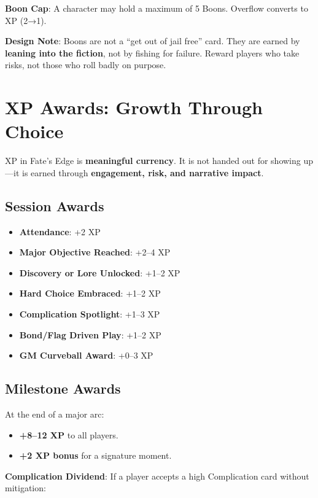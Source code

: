 \textbf{Boon Cap}: A character may hold a maximum of 5 Boons. Overflow converts to XP (2→1).

\textbf{Design Note}: Boons are not a “get out of jail free” card. They are earned by \textbf{leaning into the fiction}, not by fishing for failure. Reward players who take risks, not those who roll badly on purpose.

\section*{XP Awards: Growth Through Choice}

XP in Fate’s Edge is \textbf{meaningful currency}. It is not handed out for showing up—it is earned through \textbf{engagement, risk, and narrative impact}.

\subsection*{Session Awards}

\begin{itemize}
    \item \textbf{Attendance}: +2 XP
    \item \textbf{Major Objective Reached}: +2–4 XP
    \item \textbf{Discovery or Lore Unlocked}: +1–2 XP
    \item \textbf{Hard Choice Embraced}: +1–2 XP
    \item \textbf{Complication Spotlight}: +1–3 XP
    \item \textbf{Bond/Flag Driven Play}: +1–2 XP
    \item \textbf{GM Curveball Award}: +0–3 XP
\end{itemize}

\subsection*{Milestone Awards}

At the end of a major arc:

\begin{itemize}
    \item \textbf{+8–12 XP} to all players.
    \item \textbf{+2 XP bonus} for a signature moment.
\end{itemize}

\textbf{Complication Dividend}: If a player accepts a high Complication card without mitigation:

